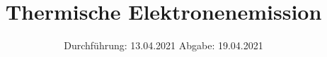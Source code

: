 

\subject{V504}
\title{Thermische Elektronenemission}
\date{%
  Durchführung: 13.04.2021
  \hspace{3em}
  Abgabe: 19.04.2021
}



\maketitle
\thispagestyle{empty}
\tableofcontents
\newpage






\printbibliography{}


